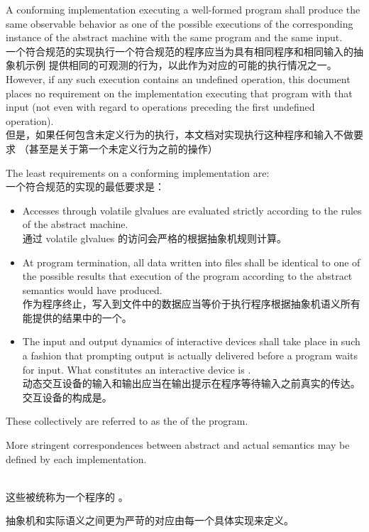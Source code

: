 %
%
\pnum
A conforming implementation executing a well-formed program shall
produce the same observable behavior as one of the possible executions
of the corresponding instance of the abstract machine with the
same program and the same input. \\
一个符合规范的实现执行一个符合规范的程序应当为具有相同程序和相同输入的抽象机示例
提供相同的可观测的行为，以此作为对应的可能的执行情况之一。
%
However, if any such execution contains an undefined operation, this document places no
requirement on the implementation executing that program with that input
(not even with regard to operations preceding the first undefined
operation). \\
但是，如果任何包含未定义行为的执行，本文档对实现执行这种程序和输入不做要求
（甚至是关于第一个未定义行为之前的操作）

\pnum
The least requirements on a conforming implementation are: \\
一个符合规范的实现的最低要求是：
\begin{itemize}
\item
Accesses through volatile glvalues are evaluated strictly according to the
rules of the abstract machine. \\
通过 volatile glvalues 的访问会严格的根据抽象机规则计算。
\item
At program termination, all data written into files shall be
identical to one of the possible results that execution of the program
according to the abstract semantics would have produced. \\
作为程序终止，写入到文件中的数据应当等价于执行程序根据抽象机语义所有能提供的结果中的一个。
\item
The input and output dynamics of interactive devices shall take
place in such a fashion that prompting output is actually delivered before a program waits for input. What constitutes an interactive device is
. \\
动态交互设备的输入和输出应当在输出提示在程序等待输入之前真实的传达。
交互设备的构成是。
\end{itemize}

These collectively are referred to as the
 of the program.
\begin{note} More stringent correspondences between abstract and actual
semantics may be defined by each implementation. \end{note} \\
这些被统称为一个程序的 。
\begin{note}抽象机和实际语义之间更为严苛的对应由每一个具体实现来定义。\end{note}

